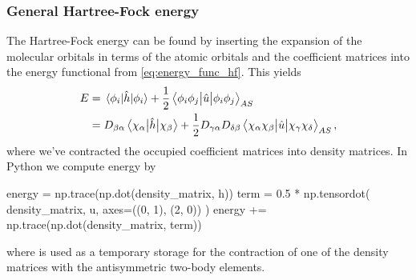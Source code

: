             \subsubsection{General Hartree-Fock energy}
                The Hartree-Fock energy can be found by inserting the expansion
                of the molecular orbitals in terms of the atomic orbitals and
                the coefficient matrices into the energy functional from
                \autoref{eq:energy_func_hf}.
                This yields
                \begin{align}
                    E
                    &= \mel{\phi_i}{\hat{h}}{\phi_i}
                    + \frac{1}{2}\mel{\phi_i\phi_j}{\hat{u}}{\phi_i\phi_j}_{AS}
                    \\
                    &=
                    D_{\beta\alpha}
                    \mel{\chi_{\alpha}}{\hat{h}}{\chi_{\beta}}
                    + \frac{1}{2}
                    D_{\gamma\alpha} D_{\delta\beta}
                    \mel{\chi_{\alpha}\chi_{\beta}}{
                        \hat{u}}{\chi_{\gamma}\chi_{\delta}}_{AS},
                    \label{eq:general-hartree-fock-energy}
                \end{align}
                where we've contracted the occupied coefficient matrices into
                density matrices.
                In Python we compute energy by
                \begin{python}
energy = np.trace(np.dot(density_matrix, h))
term = 0.5 * np.tensordot(
    density_matrix, u, axes=((0, 1), (2, 0))
)
energy += np.trace(np.dot(density_matrix, term))
                \end{python}
                where  is used as a temporary storage for the
                contraction of one of the density matrices with the
                antisymmetric two-body elements.

